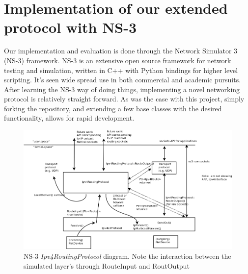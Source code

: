 \documentclass[12pt]{article} %
\begin{document}

\newpage %



\section{Implementation of our extended protocol with NS-3}

Our implementation and evaluation is done through the Network Simulator 3 (NS-3) framework. NS-3 is an extensive open source framework for network testing and simulation, written in C++ with Python bindings for higher level scripting. It's seen wide spread use in both commercial and academic pursuits. After learning the NS-3 way of doing things, implementing a novel networking protocol is relatively straight forward. As was the case with this project, simply forking the repository, and extending a few base classes with the desired functionality, allows for rapid development.

\begin{figure}[ht!]
\includegraphics[width=160mm]{routing.png}
\caption{NS-3 {\it Ipv4RoutingProtocol} diagram. Note the interaction between the simulated layer's through RouteInput and RoutOutput\cite{ns-3-routing}}
\end{figure}
\end{document}
